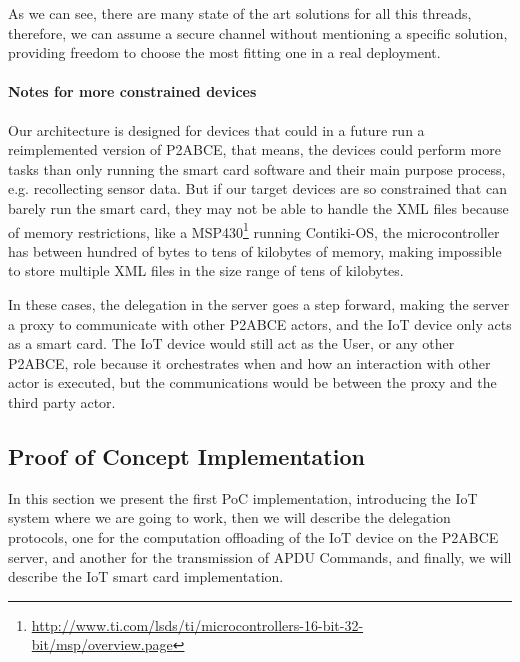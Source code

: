 \documentclass[journal]{IEEEtran}
\begin{document}
As we can see, there are many state of the art solutions for all this threads, therefore, we can assume a secure channel without mentioning a specific solution, providing freedom to choose the most fitting one in a real deployment.


\paragraph{Notes for more constrained devices}

Our architecture is designed for devices that could in a future run a reimplemented version of P2ABCE, that means, the devices could perform more tasks than only running the smart card software and their main purpose process, e.g. recollecting sensor data. But if our target devices are so constrained that can barely run the smart card, they may not be able to handle the XML files because of memory restrictions, like a MSP430\footnote{\url{http://www.ti.com/lsds/ti/microcontrollers-16-bit-32-bit/msp/overview.page}} running Contiki-OS, the microcontroller has between hundred of bytes to tens of kilobytes of memory, making impossible to store multiple XML files in the size range of tens of kilobytes.

In these cases, the delegation in the server goes a step forward, making the server a proxy to communicate with other P2ABCE actors, and the IoT device only acts as a smart card. The IoT device would still act as the User, or any other P2ABCE, role because it orchestrates when and how an interaction with other actor is executed, but the communications would be between the proxy and the third party actor. 



\subsection{Proof of Concept Implementation}
%
%  


In this section we present the first PoC implementation, introducing the IoT system where we are going to work, then we will describe the delegation protocols, one for the computation offloading of the IoT device on the P2ABCE server, and another for the transmission of APDU Commands, and finally, we will describe the IoT smart card implementation.
\end{document}
